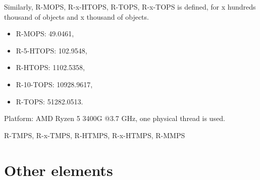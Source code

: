\documentclass[9pt,a4paper,twoside]{article}
\begin{document}
    Similarly, R-MOPS, R-x-HTOPS,  R-TOPS, R-x-TOPS is defined, for x hundreds thousand of objects and x thousand of objects.

    \begin{itemize}
        \item R-MOPS: 49.0461,
        \item R-5-HTOPS: 102.9548, 
        \item R-HTOPS: 1102.5358,
        \item R-10-TOPS: 10928.9617,
        \item R-TOPS: 51282.0513.
    \end{itemize}
 
    Platform: AMD Ryzen 5 3400G @3.7 GHz, one physical thread is used.
    
    R-TMPS, R-x-TMPS, R-HTMPS, R-x-HTMPS, R-MMPS
    
    \section{Other elements}

        
\end{document}
